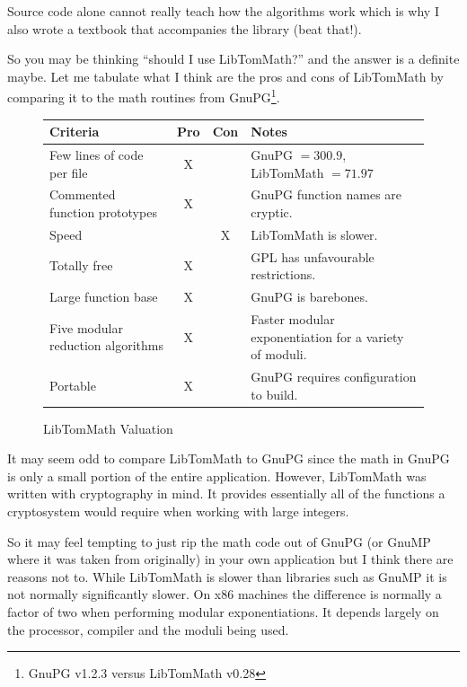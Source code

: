 \documentclass[synpaper]{book}
\begin{document}
Source code alone cannot really teach how the algorithms work which is why I also wrote a textbook that accompanies
the library (beat that!).

So you may be thinking ``should I use LibTomMath?'' and the answer is a definite maybe.  Let me tabulate what I think
are the pros and cons of LibTomMath by comparing it to the math routines from GnuPG\footnote{GnuPG v1.2.3 versus LibTomMath v0.28}.

\newpage\begin{figure}[here]
\begin{small}
\begin{center}
\begin{tabular}{|l|c|c|l|}
\hline \textbf{Criteria} & \textbf{Pro} & \textbf{Con} & \textbf{Notes} \\
\hline Few lines of code per file & X & & GnuPG $ = 300.9$, LibTomMath  $ = 71.97$ \\
\hline Commented function prototypes & X && GnuPG function names are cryptic. \\
\hline Speed && X & LibTomMath is slower.  \\
\hline Totally free & X & & GPL has unfavourable restrictions.\\
\hline Large function base & X & & GnuPG is barebones. \\
\hline Five modular reduction algorithms & X & & Faster modular exponentiation for a variety of moduli. \\
\hline Portable & X & & GnuPG requires configuration to build. \\
\hline
\end{tabular}
\end{center}
\end{small}
\caption{LibTomMath Valuation}
\end{figure}

It may seem odd to compare LibTomMath to GnuPG since the math in GnuPG is only a small portion of the entire application. 
However, LibTomMath was written with cryptography in mind.  It provides essentially all of the functions a cryptosystem
would require when working with large integers.  

So it may feel tempting to just rip the math code out of GnuPG (or GnuMP where it was taken from originally) in your
own application but I think there are reasons not to.  While LibTomMath is slower than libraries such as GnuMP it is
not normally significantly slower.  On x86 machines the difference is normally a factor of two when performing modular
exponentiations.  It depends largely on the processor, compiler and the moduli being used.
\end{document}
